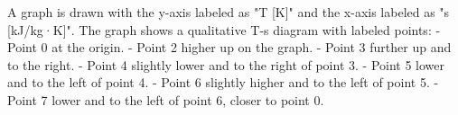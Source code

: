 A graph is drawn with the y-axis labeled as "T [K]" and the x-axis labeled as "s [kJ/kg·K]". The graph shows a qualitative T-s diagram with labeled points:  
- Point 0 at the origin.  
- Point 2 higher up on the graph.  
- Point 3 further up and to the right.  
- Point 4 slightly lower and to the right of point 3.  
- Point 5 lower and to the left of point 4.  
- Point 6 slightly higher and to the left of point 5.  
- Point 7 lower and to the left of point 6, closer to point 0.